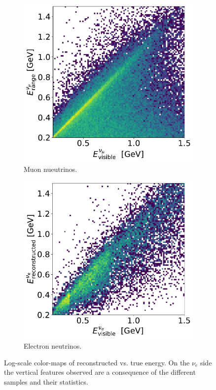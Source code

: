 \begin{figure}[H] 
\begin{center}
    \begin{subfigure}[b]{0.4\textwidth}
    \centering
    \includegraphics[width=1.00\textwidth]{ereco/numu_energy_visible_eres2D.pdf}
    \caption{\label{fig:eres:numu:2d} Muon nueutrinos. }
    \end{subfigure}
    \begin{subfigure}[b]{0.4\textwidth}
    \centering
    \includegraphics[width=1.00\textwidth]{ereco/nue_visible_eres2D.pdf}
    \caption{\label{fig:eres:nue:vstrue} Electron neutrinos.}
    \end{subfigure}
\caption{\label{fig:eres:neutrino}Log-scale color-maps of reconstructed vs. true energy. On the $\nu_e$ side the vertical features observed are a consequence of the different samples  and their statistics.}
\end{center}
\end{figure}

